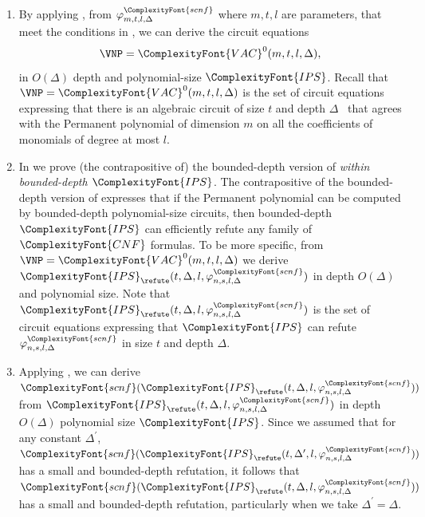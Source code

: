 \documentclass[11pt,letter]{article}
\theoremstyle{remark} %
\newcommand{\IPS}{%
    {
        \ComplexityFont{IPS} 
    }
}
\newcommand{\CNF}{ %
    {
        \ComplexityFont{CNF}
    }
}
\newcommand{\scnf}{
    {
        \ComplexityFont{scnf}
    }
}
\newcommand{\VAC}{
    {
        \ComplexityFont{VAC}
    }
}
\begin{document}
{        \begin{enumerate}
            
            \item \label{it:2292}
            By applying , from $\varphi_{m,t,l,\Delta}^\scnf$ where $m,t,l$ are parameters, that meet the conditions in , we can derive the circuit equations
            \[
                \VNP=\VAC^0(m,t,l,\Delta),
            \]
            in $O(\Delta)$ depth and polynomial-size $\IPS$. Recall that $\VNP=\VAC^0(m,t,l,\Delta)$ is the set of circuit equations expressing that there is an algebraic circuit of size $t$ and depth $\Delta$ \ that agrees with the Permanent polynomial of dimension $m$ on all the coefficients of monomials of degree at most $l$.       


            \item \label{it:2301}
             In  we prove (the contrapositive of) the bounded-depth version of  \emph{within bounded-depth $\IPS$}.
            The contrapositive of the bounded-depth version of  expresses that if the Permanent polynomial can be computed by bounded-depth polynomial-size circuits, then bounded-depth $\IPS$ can efficiently refute any family of $\CNF$ formulas. 
            To be more specific, from $\VNP=\VAC^0(m,t,l,\Delta)$ we derive $\IPS_\refute(t,\Delta,l,\varphi_{n,s,l,\Delta}^\scnf)$ in depth $O(\Delta)$ and polynomial size. Note that $\IPS_\refute(t,\Delta,l,\varphi_{n,s,l,\Delta}^\scnf)$ is the set of circuit equations expressing that $\IPS$ can refute $\varphi_{n,s,l,\Delta}^\scnf$ in size $t$ and depth $\Delta$.
        
            \item \label{it:2306} Applying , we can derive $\scnf(\IPS_\refute(t,\Delta,l,\varphi_{n,s,l,\Delta}^\scnf))$ from $\IPS_\refute(t,\Delta,l,\varphi_{n,s,l,\Delta}^\scnf)$ in depth $O(\Delta)$ polynomial size $\IPS$.
            Since we assumed that for any constant $\Delta^\prime$, $\scnf(\IPS_\refute(t,\Delta^\prime,l,\varphi_{n,s,l,\Delta}^\scnf))$ has a small and bounded-depth refutation, it follows that $\scnf(\IPS_\refute(t,\Delta,l,\varphi_{n,s,l,\Delta}^\scnf))$ has a small and bounded-depth refutation, particularly when we take $\Delta^\prime = \Delta$.
        \end{enumerate}
        
}
\end{document}
